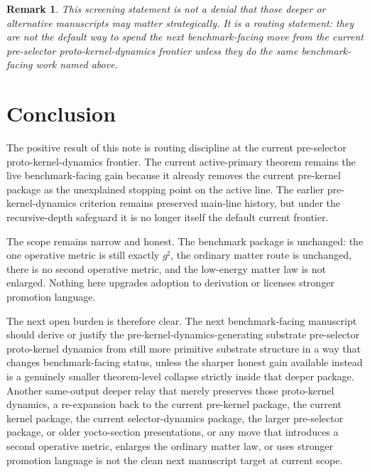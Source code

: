\documentclass[11pt]{article}
\newcommand{\CompletedMetric}{g^{\sharp}}
\newtheorem{remark}{Remark}
\begin{document}
\begin{remark}
This screening statement is not a denial that those deeper or alternative manuscripts may matter strategically. It is a routing statement: they are not the default way to spend the next benchmark-facing move from the current pre-selector proto-kernel-dynamics frontier unless they do the same benchmark-facing work named above.
\end{remark}

\section{Conclusion}

The positive result of this note is routing discipline at the current pre-selector proto-kernel-dynamics frontier. The current active-primary theorem remains the live benchmark-facing gain because it already removes the current pre-kernel package as the unexplained stopping point on the active line. The earlier pre-kernel-dynamics criterion remains preserved main-line history, but under the recursive-depth safeguard it is no longer itself the default current frontier.

The scope remains narrow and honest. The benchmark package is unchanged: the one operative metric is still exactly \(\CompletedMetric\), the ordinary matter route is unchanged, there is no second operative metric, and the low-energy matter law is not enlarged. Nothing here upgrades adoption to derivation or licenses stronger promotion language.

The next open burden is therefore clear. The next benchmark-facing manuscript should derive or justify the pre-kernel-dynamics-generating substrate pre-selector proto-kernel dynamics from still more primitive substrate structure in a way that changes benchmark-facing status, unless the sharper honest gain available instead is a genuinely smaller theorem-level collapse strictly inside that deeper package. Another same-output deeper relay that merely preserves those proto-kernel dynamics, a re-expansion back to the current pre-kernel package, the current kernel package, the current selector-dynamics package, the larger pre-selector package, or older yocto-section presentations, or any move that introduces a second operative metric, enlarges the ordinary matter law, or uses stronger promotion language is not the clean next manuscript target at current scope.
\end{document}

